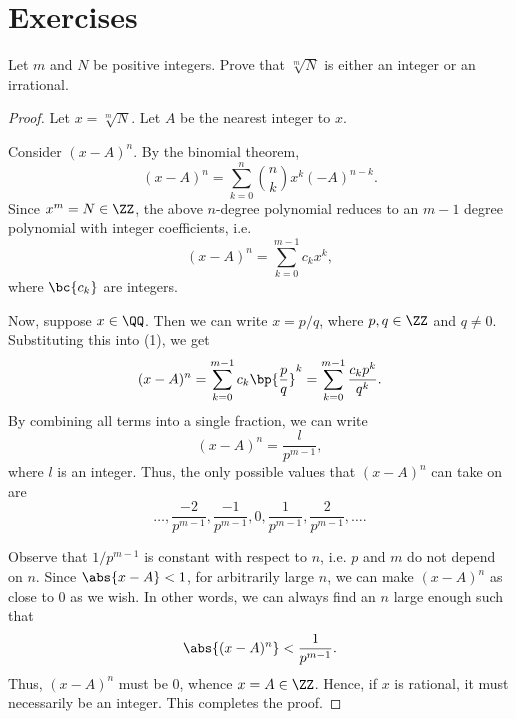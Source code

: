 \section{Exercises}

\begin{problem}
    Let $m$ and $N$ be positive integers. Prove that $\sqrt[m]{N}$ is either an integer or an irrational.
\end{problem}
\begin{proof}
    Let $x = \sqrt[m]{N}$. Let $A$ be the nearest integer to $x$.
    
    Consider $(x-A)^n$. By the binomial theorem, \[(x-A)^n = \sum_{k = 0}^n \binom{n}{k} x^k (-A)^{n-k}.\] Since $x^m = N \in \ZZ$, the above $n$-degree polynomial reduces to an $m-1$ degree polynomial with integer coefficients, i.e. \[(x-A)^n = \sum_{k = 0}^{m-1} c_k x^k, \tag{1}\] where $\bc{c_k}$ are integers.

    Now, suppose $x \in \QQ$. Then we can write $x = p/q$, where $p, q \in \ZZ$ and $q \neq 0$. Substituting this into (1), we get \[(x-A)^n = \sum_{k = 0}^{m-1} c_k \bp{\frac{p}{q}}^k = \sum_{k = 0}^{m-1} \frac{c_k p^k}{q^k}.\] By combining all terms into a single fraction, we can write \[(x-A)^n = \frac{l}{p^{m-1}},\] where $l$ is an integer. Thus, the only possible values that $(x-A)^n$ can take on are \[\dots, \frac{-2}{p^{m-1}}, \frac{-1}{p^{m-1}}, 0, \frac{1}{p^{m-1}}, \frac{2}{p^{m-1}}, \dots.\]

    Observe that $1/p^{m-1}$ is constant with respect to $n$, i.e. $p$ and $m$ do not depend on $n$. Since $\abs{x - A} < 1$, for arbitrarily large $n$, we can make $(x-A)^n$ as close to 0 as we wish. In other words, we can always find an $n$ large enough such that \[\abs{(x-A)^n} < \frac1{p^{m-1}}.\] Thus, $(x-A)^n$ must be 0, whence $x = A \in \ZZ$. Hence, if $x$ is rational, it must necessarily be an integer. This completes the proof.
\end{proof}

